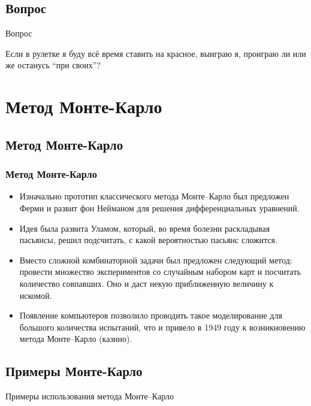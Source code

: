 \documentclass[compress,red]{beamer}
\begin{document}
\subsection{Вопрос}
\begin{frame}
  \begin{center}
    \Huge{Вопрос}
  \end{center}
  \begin{center}
    \Large{Если в рулетке я буду всё время ставить на красное, выиграю я, проиграю ли или же останусь ``при своих''?}
  \end{center}
\end{frame}

\section{Метод Монте-Карло}

\subsection{Метод Монте-Карло}
\begin{frame}[fragile]
  \frametitle{Метод Монте-Карло}
  \begin{itemize}
    \item Изначально прототип классического метода Монте--Карло был предложен Ферми и развит фон Нейманом для решения дифференциальных уравнений.
    \item Идея была развита Уламом, который, во время болезни раскладывая пасьянсы, решил подсчитать, с какой вероятностью пасьянс сложится.
    \item Вместо сложной комбинаторной задачи был предложен следующий метод: провести множество экспериментов со случайным набором карт и посчитать количество совпавших. Оно и даст некую приближенную величину к искомой.
    \item Появление компьютеров позволило проводить такое моделирование для большого количества испытаний, что и привело в 1949 году к возникновению метода Монте--Карло (казино).
  \end{itemize}
\end{frame}

\subsection{Примеры Монте-Карло}
\begin{frame}
  \begin{center}
    \Huge{Примеры использования метода Монте--Карло}
  \end{center}
\end{frame}
\end{document}

